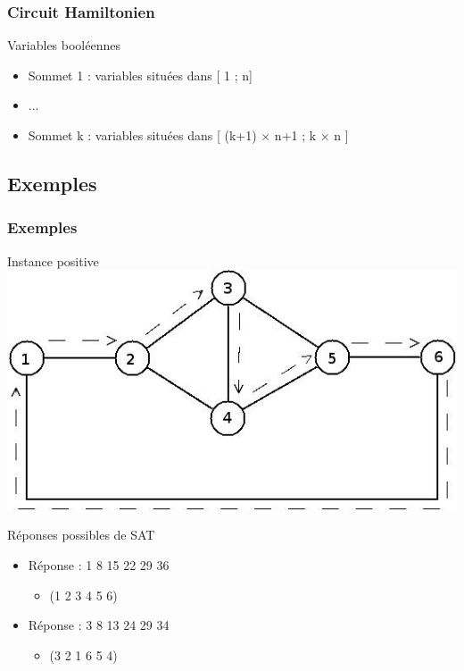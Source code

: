 \begin{frame}
\frametitle{Circuit Hamiltonien}
\begin{block}{Variables bool\'eennes}
  \begin{itemize}
  \item Sommet 1 : variables situ\'ees dans [ 1 ; n]
  \item ...
  \item Sommet k : variables situ\'ees dans [ (k+1) $\times$ n+1 ;
    k $\times$ n ]
  \end{itemize}
\end{block}
\end{frame}

\subsection{Exemples}

\begin{frame}
\frametitle{Exemples}
\begin{block}{Instance positive}
\includegraphics[scale=0.3]{positif.jpeg}
\end{block}
\begin{block}{R\'eponses possibles de SAT}
  \begin{itemize}
  \item R\'eponse : 1 8 15 22 29 36
    \begin{itemize}
    \item (1 2 3 4 5 6)
    \end{itemize}
  \end{itemize}
 \begin{itemize}
  \item R\'eponse : 3 8 13 24 29 34
    \begin{itemize}
    \item (3 2 1 6 5 4)
    \end{itemize}
  \end{itemize}
\end{block}
\end{frame}


